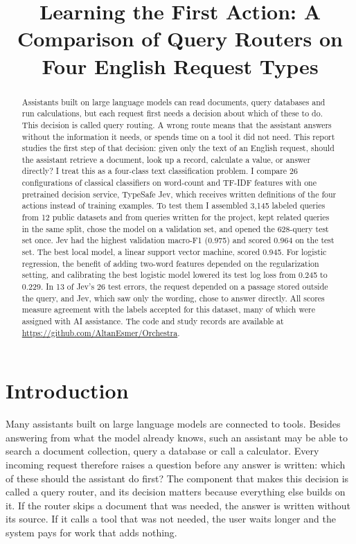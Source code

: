 \documentclass[conference]{IEEEtran}
\title{Learning the First Action: A Comparison of Query Routers on Four English Request Types}
\author{\IEEEauthorblockN{Altan Esmer}
\IEEEauthorblockA{Orchestra project 13}}
\begin{document}
\maketitle
\begin{abstract}
Assistants built on large language models can read documents, query databases and run calculations, but each request first needs a decision about which of these to do. This decision is called query routing. A wrong route means that the assistant answers without the information it needs, or spends time on a tool it did not need. This report studies the first step of that decision: given only the text of an English request, should the assistant retrieve a document, look up a record, calculate a value, or answer directly? I treat this as a four-class text classification problem. I compare 26 configurations of classical classifiers on word-count and TF-IDF features with one pretrained decision service, TypeSafe Jev, which receives written definitions of the four actions instead of training examples. To test them I assembled 3,145 labeled queries from 12 public datasets and from queries written for the project, kept related queries in the same split, chose the model on a validation set, and opened the 628-query test set once. Jev had the highest validation macro-F1 (0.975) and scored 0.964 on the test set. The best local model, a linear support vector machine, scored 0.945. For logistic regression, the benefit of adding two-word features depended on the regularization setting, and calibrating the best logistic model lowered its test log loss from 0.245 to 0.229. In 13 of Jev's 26 test errors, the request depended on a passage stored outside the query, and Jev, which saw only the wording, chose to answer directly. All scores measure agreement with the labels accepted for this dataset, many of which were assigned with AI assistance. The code and study records are available at \url{https://github.com/AltanEsmer/Orchestra}.
\end{abstract}

\section{Introduction}
Many assistants built on large language models are connected to tools. Besides answering from what the model already knows, such an assistant may be able to search a document collection, query a database or call a calculator. Every incoming request therefore raises a question before any answer is written: which of these should the assistant do first? The component that makes this decision is called a query router, and its decision matters because everything else builds on it. If the router skips a document that was needed, the answer is written without its source. If it calls a tool that was not needed, the user waits longer and the system pays for work that adds nothing.
\end{document}
